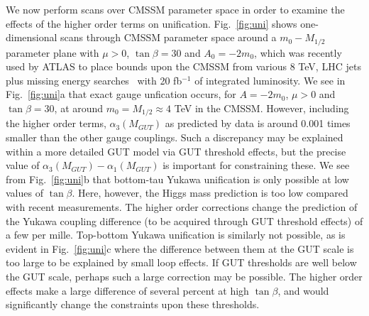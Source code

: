 \documentclass[final,3p,times,pdflatex]{elsarticle}
\begin{document}
We now perform scans over CMSSM parameter space in order to examine the
effects of the higher order terms on unification. 
Fig.~\ref{fig:uni} shows one-dimensional scans through CMSSM parameter space
around a 
$m_0-M_{1/2}$ parameter plane with $\mu>0$, $\tan \beta=30$ and $A_0=-2m_0$,
which was 
recently used by ATLAS to place bounds upon the CMSSM from various 8
TeV,  LHC jets plus missing energy
searches~\cite{ATLAS-CONF-2013-047,Aad:2013wta} with 20 fb$^{-1}$ of
integrated luminosity.  
We see in Fig.~\ref{fig:uni}a that exact gauge unfication occurs, for
$A=-2m_0$, $\mu>0$ and $\tan \beta=30$, at around $m_0=M_{1/2}\approx 4$ TeV
in the CMSSM. However, including the higher order terms, $\alpha_3(M_{GUT})$
as predicted by data is around 0.001 times smaller than the other gauge
couplings. Such a discrepancy may be explained within a more detailed GUT model
via GUT threshold effects, but the precise value of
$\alpha_3(M_{GUT})-\alpha_1(M_{GUT})$ is important for constraining these. 
We see from Fig.~\ref{fig:uni}b that bottom-tau Yukawa unification is only
possible at low values of $\tan \beta$. Here, however, the Higgs mass
prediction is too low compared with recent measurements. The higher order
corrections change the prediction of the Yukawa coupling difference (to be 
acquired through GUT threshold effects) of a few per mille. Top-bottom Yukawa
unification is similarly not possible, as is evident in Fig.~\ref{fig:uni}c
where the difference between them at the GUT scale is too large to be
explained by small loop effects. If GUT thresholds are well below the GUT
scale, perhaps such a large correction may be possible. The higher order
effects make a large difference of several percent at high $\tan \beta$, and 
would significantly change the constraints upon these thresholds. 
\end{document}

